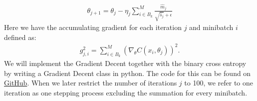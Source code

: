\documentclass[11pt]{article}
\begin{document}
\begin{align*}
    \theta_{j+1} = \theta_j - \eta_j\sum_{i \in B_k}^M \frac{\hat{m}_j}{\sqrt{\hat{s}_j} + \epsilon }
\end{align*}
Here we have the accumulating gradient for each iteration $j$ and minibatch $i$ defined as:
\begin{align*}
    g_{j, i}^2 = \sum_{i \in B_k}^M(\nabla_\theta C(x_i, \theta_j))^2.
\end{align*}
We will implement the Gradient Decent together with the binary cross entropy by writing a Gradient Decent class in python. The code for this can be found on \href{https://github.com/Fslippe/FYS-STK4155/tree/main/project3}{GitHub}. When we later restrict the number of iterations $j$ to 100, we refer to one iteration as one stepping process excluding the summation for every minibatch.
\end{document}
